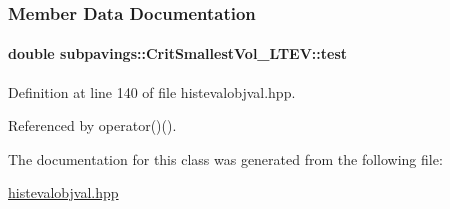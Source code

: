 \subsubsection{\-Member \-Data \-Documentation}
\hypertarget{classsubpavings_1_1CritSmallestVol__LTEV_ab806e08cdf3e5c0b4e6411df0d76db3c}{
\paragraph[{test}]{\setlength{\rightskip}{0pt plus 5cm}double {\bf subpavings\-::\-Crit\-Smallest\-Vol\-\_\-\-L\-T\-E\-V\-::test}}}\label{classsubpavings_1_1CritSmallestVol__LTEV_ab806e08cdf3e5c0b4e6411df0d76db3c}


\-Definition at line 140 of file histevalobjval.\-hpp.



\-Referenced by operator()().



\-The documentation for this class was generated from the following file\-:\begin{DoxyCompactItemize}
\item 
\hyperlink{histevalobjval_8hpp}{histevalobjval.\-hpp}\end{DoxyCompactItemize}
